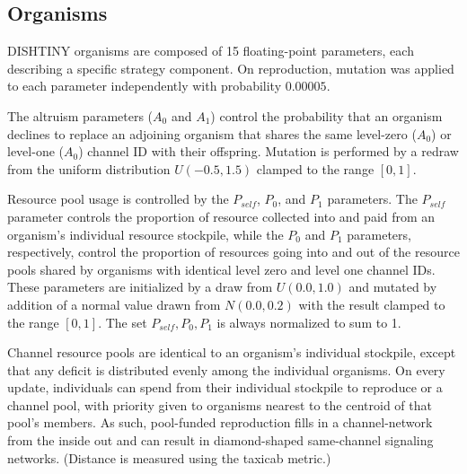 \subsection{Organisms}

DISHTINY organisms are composed of 15 floating-point parameters,
each describing a specific strategy component.
On reproduction, mutation was applied to each parameter independently with probability $0.00005$.

The altruism parameters ($A_0$ and $A_1$) control the probability that an organism declines to replace an adjoining organism that shares the same level-zero ($A_0$) or level-one ($A_0$) channel ID with their offspring.
Mutation is performed by a redraw from the uniform distribution $U(-0.5,1.5)$ clamped to the range $[0,1]$.

Resource pool usage is controlled by the $P_{self}$, $P_0$, and $P_1$ parameters.
The $P_{self}$ parameter controls the proportion of resource collected into and paid from an organism's individual resource stockpile, while the $P_0$ and $P_1$ parameters, respectively, control the proportion of resources going into and out of the resource pools shared by organisms with identical level zero and level one channel IDs.
These parameters are initialized by a draw from $U(0.0, 1.0)$ and mutated by addition of a normal value drawn from $N(0.0,0.2)$ with the result clamped to the range $[0,1]$.
The set $P_{self}, P_0, P_1$ is always normalized to sum to 1.

Channel resource pools are identical to an organism's individual stockpile, except that any deficit is distributed evenly among the individual organisms.
On every update, individuals can spend from their individual stockpile to reproduce
or a channel pool, with priority given to organisms nearest to the centroid of that pool's members.
As such, pool-funded reproduction fills in a channel-network from the inside out and can result in diamond-shaped same-channel signaling networks.
(Distance is measured using the taxicab metric.)

